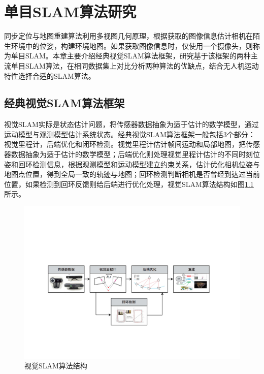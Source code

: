 
\chapter{单目SLAM算法研究}
\label{chap:ALGORITHM}

同步定位与地图重建算法利用多视图几何原理\upcite{[1.1]}，根据获取的图像信息估计相机在陌生环境中的位姿，构建环境地图。如果获取图像信息时，仅使用一个摄像头，则称为单目SLAM。本章主要介绍经典视觉SLAM算法框架，研究基于该框架的两种主流单目SLAM算法，在相同数据集上对比分析两种算法的优缺点，结合无人机运动特性选择合适的SLAM算法。

\section{经典视觉SLAM算法框架}
视觉SLAM实际是状态估计问题，将传感器数据抽象为适于估计的数学模型，通过运动模型与观测模型估计系统状态。经典视觉SLAM算法框架\upcite{[3.1]}一般包括3个部分：视觉里程计，后端优化和闭环检测。视觉里程计估计帧间运动和局部地图，把传感器数据抽象为适于估计的数学模型；后端优化则处理视觉里程计估计的不同时刻位姿和回环检测信息，根据观测模型和运动模型建立约束关系，估计优化相机位姿与地图点位置，得到全局一致的轨迹与地图；回环检测判断相机是否曾经到达过当前位置，如果检测到回环反馈则给后端进行优化处理，视觉SLAM算法结构如图\ref{fig3.1}所示。

\begin{figure}[h]
\centering
\includegraphics[scale=0.3,angle=-90]{figures/Fig3-1.pdf}
\caption{视觉SLAM算法结构}
\label{fig3.1}
\end{figure}

